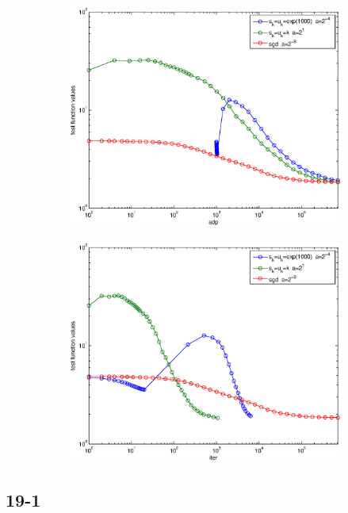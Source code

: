 \documentclass[12pt]{article}
\begin{document}
	\begin{figure}[H]
	\begin{subfigure}[b]{.5\linewidth}
		        \includegraphics[width=4in]{GenFigures/18-2-1.eps}
	\end{subfigure}%
	\begin{subfigure}[b]{.5\linewidth}
		        \includegraphics[width=4in]{GenFigures/18-2-2.eps}
	\end{subfigure}%

	\end{figure}
	
	\subsection{19-1}
\end{document}
